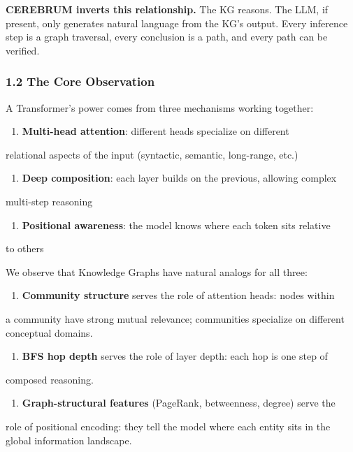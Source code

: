 \documentclass[10pt,journal,compsoc]{IEEEtran}
\begin{document}
\textbf{CEREBRUM inverts this relat\-ionship.} The KG reasons. The LLM, if present,
only generates natural language from the KG's output. Every inference step is
a graph traversal, every conclusion is a path, and every path can be verified.

\subsubsection{1.2 The Core Observation}

A Transformer's power comes from three mechanisms working together:

\begin{enumerate}
\item \textbf{Multi-head attention}: different heads specialize on different
\end{enumerate}
   relational aspects of the input (syntactic, semantic, long-range, etc.)
\begin{enumerate}
\item \textbf{Deep composition}: each layer builds on the previous, allowing complex
\end{enumerate}
   multi-step reasoning
\begin{enumerate}
\item \textbf{Positional awareness}: the model knows where each token sits relative
\end{enumerate}
   to others

We observe that Knowledge Graphs have natural analogs for all three:

\begin{enumerate}
\item \textbf{Community structure} serves the role of attention heads: nodes within
\end{enumerate}
   a community have strong mutual relevance; communities specialize on
   different conceptual domains.
\begin{enumerate}
\item \textbf{BFS hop depth} serves the role of layer depth: each hop is one step of
\end{enumerate}
   composed reasoning.
\begin{enumerate}
\item \textbf{Graph-structural features} (PageRank, betweenness, degree) serve the
\end{enumerate}
   role of positional encoding: they tell the model where each entity sits in
   the global information landscape.
\end{document}

